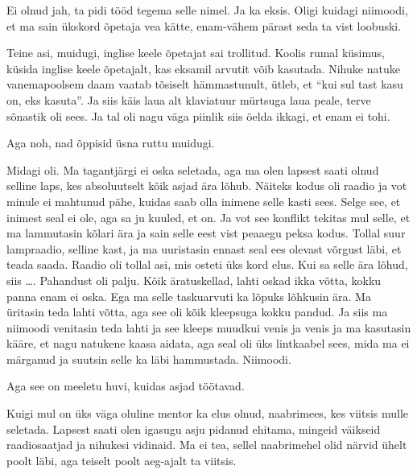 
Ei olnud jah, ta pidi tööd tegema selle nimel. Ja ka eksis. Oligi kuidagi niimoodi, et ma sain ükskord õpetaja vea kätte,  enam-vähem pärast seda ta vist loobuski. 

Teine asi, muidugi, inglise keele õpetajat sai trollitud. Koolis rumal küsimus, küsida inglise keele õpetajalt, kas eksamil arvutit võib kasutada. Nihuke natuke vanemapoolsem daam vaatab tõsiselt hämmastunult, ütleb, et \enquote{kui sul tast kasu on, eks kasuta}. Ja siis käis laua alt  klaviatuur mürtsuga laua peale,  terve sõnastik oli sees. Ja tal oli nagu väga piinlik siis  öelda ikkagi, et enam ei tohi. 

Aga noh, nad õppisid üsna ruttu muidugi.


Midagi oli. Ma tagantjärgi ei oska seletada, aga ma olen lapsest saati olnud selline laps, kes absoluutselt kõik asjad ära lõhub. Näiteks kodus oli raadio ja vot minule ei mahtunud pähe, kuidas saab olla inimene selle kasti sees. Selge see, et inimest seal  ei ole, aga sa ju kuuled, et on. Ja vot see konflikt tekitas mul selle, et ma lammutasin kõlari ära ja sain selle eest vist peaaegu peksa kodus. Tollal suur lampraadio, selline kast,  ja  ma uuristasin ennast  seal ees olevast võrgust läbi, et teada saada. Raadio oli tollal asi, mis osteti üks kord elus. Kui sa selle ära lõhud, siis \ldots. Pahandust oli palju. Kõik äratuskellad, lahti oskad ikka võtta, kokku panna enam ei oska. Ega ma selle taskuarvuti ka lõpuks lõhkusin ära. Ma üritasin teda lahti võtta, aga see oli kõik kleepsuga kokku pandud. Ja siis ma niimoodi venitasin teda lahti ja see kleeps muudkui venis ja venis ja ma kasutasin kääre, et nagu natukene kaasa aidata, aga seal oli üks lintkaabel sees, mida ma ei märganud ja suutsin selle ka läbi hammustada. Niimoodi. 

Aga see on meeletu huvi, kuidas asjad töötavad. 

Kuigi mul on üks väga oluline mentor ka elus olnud, naabrimees, kes viitsis mulle seletada. Lapsest saati olen igasugu asju pidanud ehitama, mingeid väikseid raadiosaatjad ja nihukesi vidinaid. Ma ei tea, sellel naabrimehel olid närvid ühelt poolt läbi, aga teiselt poolt aeg-ajalt ta viitsis. 


